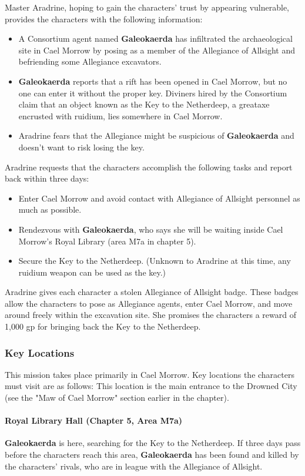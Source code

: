 \documentclass[10pt,a4,twoside,twocolumn,openany,nodeprecatedcode]{dndbook}
\begin{document}
Master Aradrine, hoping to gain the characters' trust by appearing vulnerable, provides the characters with the following information:
\begin{itemize}

\item A Consortium agent named \textbf{Galeokaerda} has infiltrated the archaeological site in Cael Morrow by posing as a member of the Allegiance of Allsight and befriending some Allegiance excavators.
\item \textbf{Galeokaerda} reports that a rift has been opened in Cael Morrow, but no one can enter it without the proper key. Diviners hired by the Consortium claim that an object known as the Key to the Netherdeep, a greataxe encrusted with ruidium, lies somewhere in Cael Morrow.
\item Aradrine fears that the Allegiance might be suspicious of \textbf{Galeokaerda} and doesn't want to risk losing the key.
\end{itemize}


Aradrine requests that the characters accomplish the following tasks and report back within three days:
\begin{itemize}

\item Enter Cael Morrow and avoid contact with Allegiance of Allsight personnel as much as possible.
\item Rendezvous with \textbf{Galeokaerda}, who says she will be waiting inside Cael Morrow's Royal Library (area M7a in chapter 5).
\item Secure the Key to the Netherdeep. (Unknown to Aradrine at this time, any ruidium weapon can be used as the key.)
\end{itemize}


Aradrine gives each character a stolen Allegiance of Allsight badge. These badges allow the characters to pose as Allegiance agents, enter Cael Morrow, and move around freely within the excavation site.
She promises the characters a reward of 1,000 gp for bringing back the Key to the Netherdeep.
\subsubsection{Key Locations}
This mission takes place primarily in Cael Morrow. Key locations the characters must visit are as follows:
{{This location is the main entrance to the Drowned City (see the "Maw of Cael Morrow" section earlier in the chapter).}}
\paragraph{Royal Library Hall (Chapter 5, Area M7a)}
\textbf{Galeokaerda} is here, searching for the Key to the Netherdeep. If three days pass before the characters reach this area, \textbf{Galeokaerda} has been found and killed by the characters' rivals, who are in league with the Allegiance of Allsight.
\end{document}
